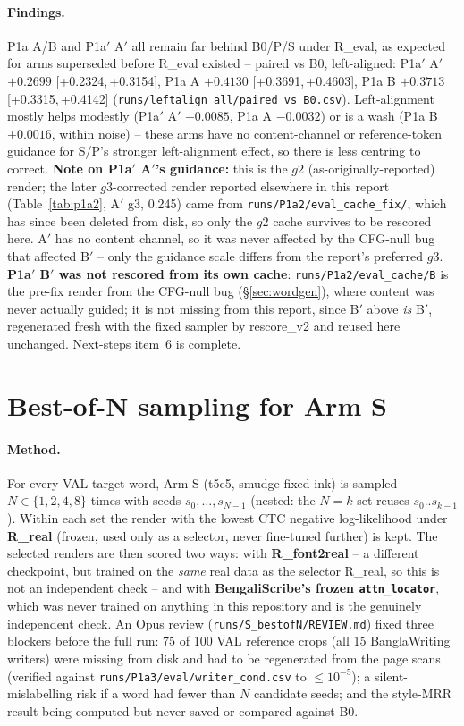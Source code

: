 \documentclass[10.5pt,a4paper]{article}
\newcommand{\fp}[1]{\nolinkurl{#1}}
\newcommand{\Bp}{B$'$}
\newcommand{\Ap}{A$'$}
\newcommand{\ci}[2]{{\footnotesize[#1,\,#2]}}
\begin{document}
\paragraph{Findings.} P1a A/B and P1a$'$ A$'$ all remain far behind B0/P/S under R\_eval, as expected for arms superseded
before R\_eval existed -- paired vs B0, left-aligned: P1a$'$ A$'$ $+0.2699$ \ci{+0.2324}{+0.3154}, P1a A $+0.4130$
\ci{+0.3691}{+0.4603}, P1a B $+0.3713$ \ci{+0.3315}{+0.4142} (\fp{runs/leftalign_all/paired_vs_B0.csv}). Left-alignment
mostly helps modestly (P1a$'$ A$'$ $-0.0085$, P1a A $-0.0032$) or is a wash (P1a B $+0.0016$, within noise) -- these arms
have no content-channel or reference-token guidance for S/P's stronger left-alignment effect, so there is less centring to
correct. \textbf{Note on P1a$'$ A$'$'s guidance:} this is the $g2$ (as-originally-reported) render; the later $g3$-corrected
render reported elsewhere in this report (Table~\ref{tab:p1a2}, \Ap{} g3, 0.245) came from \fp{runs/P1a2/eval_cache_fix/}, which has
since been deleted from disk, so only the $g2$ cache survives to be rescored here. A$'$ has no content channel, so it was
never affected by the CFG-null bug that affected \Bp{} -- only the guidance scale differs from the report's preferred
$g3$. \textbf{P1a$'$ B$'$ was not rescored from its own cache}: \fp{runs/P1a2/eval_cache/B} is the pre-fix render from the
CFG-null bug (\S\ref{sec:wordgen}), where content was never actually guided; it is not missing from this report, since
\Bp{} above \emph{is} B$'$, regenerated fresh with the fixed sampler by rescore\_v2 and reused here unchanged. Next-steps
item~6 is complete.

\section{Best-of-N sampling for Arm S}
\label{sec:bestofn}

\paragraph{Method.} For every VAL target word, Arm S (t5c5, smudge-fixed ink) is sampled $N\in\{1,2,4,8\}$ times with seeds
$s_0,\dots,s_{N-1}$ (nested: the $N{=}k$ set reuses $s_0..s_{k-1}$). Within each set the render with the lowest CTC
negative log-likelihood under \textbf{R\_real} (frozen, used only as a selector, never fine-tuned further) is kept. The
selected renders are then scored two ways: with \textbf{R\_font2real} -- a different checkpoint, but trained on the
\emph{same} real data as the selector R\_real, so this is not an independent check -- and with \textbf{BengaliScribe's
frozen \texttt{attn\_locator}}, which was never trained on anything in this repository and is the genuinely independent
check. An Opus review (\fp{runs/S_bestofN/REVIEW.md}) fixed three blockers before the full run: 75 of 100 VAL reference
crops (all 15 BanglaWriting writers) were missing from disk and had to be regenerated from the page scans (verified against
\fp{runs/P1a3/eval/writer_cond.csv} to $\le10^{-5}$); a silent-mislabelling risk if a word had fewer than $N$ candidate
seeds; and the style-MRR result being computed but never saved or compared against B0.
\end{document}
